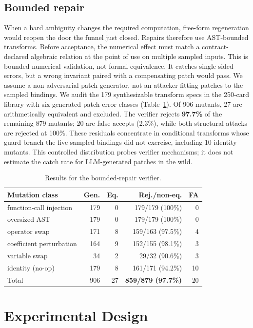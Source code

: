 \documentclass[sigconf,anonymous]{acmart}
\begin{document}
\subsection{Bounded repair}
When a hard ambiguity changes the required computation, free-form regeneration would reopen the door the funnel just closed.
Repairs therefore use AST-bounded transforms. Before acceptance, the numerical effect must match a contract-declared algebraic relation at the point of use on multiple sampled inputs.
This is bounded numerical validation, not formal equivalence. It catches single-sided errors, but a wrong invariant paired with a compensating patch would pass. We assume a non-adversarial patch generator, not an attacker fitting patches to the sampled bindings.
We audit the 179 synthesizable transform specs in the 250-card library with six generated patch-error classes (Table~\ref{tab:repairbench}). Of 906 mutants, 27 are arithmetically equivalent and excluded. The verifier rejects \textbf{97.7\%} of the remaining 879 mutants; 20 are false accepts (2.3\%), while both structural attacks are rejected at 100\%. These residuals concentrate in conditional transforms whose guard branch the five sampled bindings did not exercise, including 10 identity mutants. This controlled distribution probes verifier mechanisms; it does not estimate the catch rate for LLM-generated patches in the wild.

\begin{table}[t]
\caption{Results for the bounded-repair verifier.}
\label{tab:repairbench}
\centering
\begin{tabular}{@{}lrrrr@{}}
\toprule
Mutation class & Gen. & Eq. & Rej./non-eq. & FA \\
\midrule
function-call injection & 179 & 0 & 179/179 (100\%) & 0 \\
oversized AST & 179 & 0 & 179/179 (100\%) & 0 \\
operator swap & 171 & 8 & 159/163 (97.5\%) & 4 \\
coefficient perturbation & 164 & 9 & 152/155 (98.1\%) & 3 \\
variable swap & 34 & 2 & 29/32 (90.6\%) & 3 \\
identity (no-op) & 179 & 8 & 161/171 (94.2\%) & 10 \\
\midrule
Total & 906 & 27 & \textbf{859/879 (97.7\%)} & 20 \\
\bottomrule
\end{tabular}
\end{table}

\section{Experimental Design}\label{sec:v2design}
\end{document}
